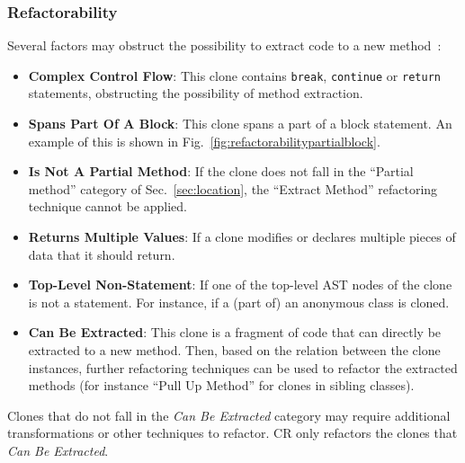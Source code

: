 \documentclass[a4paper,UKenglish,cleveref, autoref, thm-restate,authorcolumns]{lipics-v2019}
\begin{document}
\subsubsection{Refactorability} \label{sec:refactorability}
Several factors may obstruct the possibility to extract code to a new method~\cite{tsantalis2015assessing}:
\begin{itemize}
    \item \textbf{Complex Control Flow}: This clone contains \texttt{break}, \texttt{continue} or \texttt{return} statements, obstructing the possibility of method extraction.
    \item \textbf{Spans Part Of A Block}: This clone spans a part of a block statement. An example of this is shown in Fig.~\ref{fig:refactorabilitypartialblock}.
    \item \textbf{Is Not A Partial Method}: If the clone does not fall in the ``Partial method'' category of Sec.~\ref{sec:location}, the ``Extract Method'' refactoring technique cannot be applied.
    \item \textbf{Returns Multiple Values}: If a clone modifies or declares multiple pieces of data that it should return.
    \item \textbf{Top-Level Non-Statement}: If one of the top-level AST nodes of the clone is not a statement. For instance, if a (part of) an anonymous class is cloned.
    \item \textbf{Can Be Extracted}: This clone is a fragment of code that can directly be extracted to a new method. Then, based on the relation between the clone instances, further refactoring techniques can be used to refactor the extracted methods (for instance ``Pull Up Method'' for clones in sibling classes).
\end{itemize}
Clones that do not fall in the \textit{Can Be Extracted} category may require additional transformations or other techniques to refactor. CR only refactors the clones that \textit{Can Be Extracted}.
\end{document}
